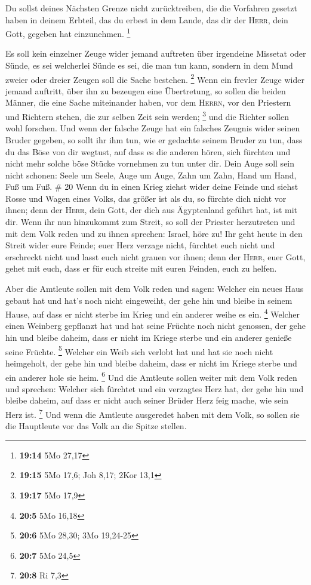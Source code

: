  Du sollst deines Nächsten Grenze nicht zurücktreiben,
die die Vorfahren gesetzt haben in deinem Erbteil, das du erbest in dem
Lande, das dir der \textsc{Herr}, dein Gott, gegeben hat einzunehmen.
\footnote{\textbf{19:14} 5Mo 27,17}

 Es soll kein einzelner Zeuge wider jemand auftreten über
irgendeine Missetat oder Sünde, es sei welcherlei Sünde es sei, die man
tun kann, sondern in dem Mund zweier oder dreier Zeugen soll die Sache
bestehen. \footnote{\textbf{19:15} 5Mo 17,6; Joh 8,17; 2Kor 13,1}
 Wenn ein frevler Zeuge wider jemand auftritt, über ihn
zu bezeugen eine Übertretung,  so sollen die beiden
Männer, die eine Sache miteinander haben, vor dem \textsc{Herrn}, vor
den Priestern und Richtern stehen, die zur selben Zeit sein werden;
\footnote{\textbf{19:17} 5Mo 17,9}  und die Richter
sollen wohl forschen. Und wenn der falsche Zeuge hat ein falsches
Zeugnis wider seinen Bruder gegeben,  so sollt ihr ihm
tun, wie er gedachte seinem Bruder zu tun, dass du das Böse von dir
wegtust,  auf dass es die anderen hören, sich fürchten
und nicht mehr solche böse Stücke vornehmen zu tun unter dir.
 Dein Auge soll sein nicht schonen: Seele um Seele, Auge
um Auge, Zahn um Zahn, Hand um Hand, Fuß um Fuß. \# 20 
Wenn du in einen Krieg ziehst wider deine Feinde und siehst Rosse und
Wagen eines Volks, das größer ist als du, so fürchte dich nicht vor
ihnen; denn der \textsc{Herr}, dein Gott, der dich aus Ägyptenland
geführt hat, ist mit dir.  Wenn ihr nun hinzukommt zum
Streit, so soll der Priester herzutreten und mit dem Volk reden
 und zu ihnen sprechen: Israel, höre zu! Ihr geht heute in
den Streit wider eure Feinde; euer Herz verzage nicht, fürchtet euch
nicht und erschreckt nicht und lasst euch nicht grauen vor ihnen;
 denn der \textsc{Herr}, euer Gott, gehet mit euch, dass
er für euch streite mit euren Feinden, euch zu helfen.

 Aber die Amtleute sollen mit dem Volk reden und sagen:
Welcher ein neues Haus gebaut hat und hat's noch nicht eingeweiht, der
gehe hin und bleibe in seinem Hause, auf dass er nicht sterbe im Krieg
und ein anderer weihe es ein. \footnote{\textbf{20:5} 5Mo 16,18}
 Welcher einen Weinberg gepflanzt hat und hat seine
Früchte noch nicht genossen, der gehe hin und bleibe daheim, dass er
nicht im Kriege sterbe und ein anderer genieße seine Früchte.
\footnote{\textbf{20:6} 5Mo 28,30; 3Mo 19,24-25}  Welcher
ein Weib sich verlobt hat und hat sie noch nicht heimgeholt, der gehe
hin und bleibe daheim, dass er nicht im Kriege sterbe und ein anderer
hole sie heim. \footnote{\textbf{20:7} 5Mo 24,5}  Und die
Amtleute sollen weiter mit dem Volk reden und sprechen: Welcher sich
fürchtet und ein verzagtes Herz hat, der gehe hin und bleibe daheim, auf
dass er nicht auch seiner Brüder Herz feig mache, wie sein Herz ist.
\footnote{\textbf{20:8} Ri 7,3}  Und wenn die Amtleute
ausgeredet haben mit dem Volk, so sollen sie die Hauptleute vor das Volk
an die Spitze stellen.

